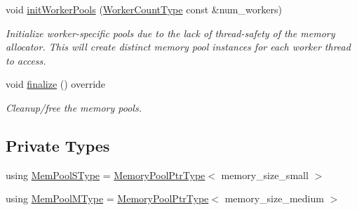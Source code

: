 \begin{DoxyCompactItemize}
void \hyperlink{structvt_1_1pool_1_1_pool_aeb8ad6a3ac3cf168dc4f2d2be2714edc}{init\+Worker\+Pools} (\hyperlink{namespacevt_aa93398ea48f2cb6c188512250f7cc248}{Worker\+Count\+Type} const \&num\+\_\+workers)
\begin{DoxyCompactList}\small\item\em Initialize worker-\/specific pools due to the lack of thread-\/safety of the memory allocator. This will create distinct memory pool instances for each worker thread to access. \end{DoxyCompactList}\item 
void \hyperlink{structvt_1_1pool_1_1_pool_a45a2880809625a77bb93c3dfcd9c7603}{finalize} () override
\begin{DoxyCompactList}\small\item\em Cleanup/free the memory pools. \end{DoxyCompactList}\end{DoxyCompactItemize}
\subsection*{Private Types}
\begin{DoxyCompactItemize}
\item 
using \hyperlink{structvt_1_1pool_1_1_pool_a9f94985824d12c43357cfe50eaaefd38}{Mem\+Pool\+S\+Type} = \hyperlink{structvt_1_1pool_1_1_pool_a21e20f5b56c3bae4f0d0cc36ed9c5eee}{Memory\+Pool\+Ptr\+Type}$<$ memory\+\_\+size\+\_\+small $>$
\item 
using \hyperlink{structvt_1_1pool_1_1_pool_a8a201b9a843e47cd4e7b568a8e4483da}{Mem\+Pool\+M\+Type} = \hyperlink{structvt_1_1pool_1_1_pool_a21e20f5b56c3bae4f0d0cc36ed9c5eee}{Memory\+Pool\+Ptr\+Type}$<$ memory\+\_\+size\+\_\+medium $>$
\end{DoxyCompactItemize}
